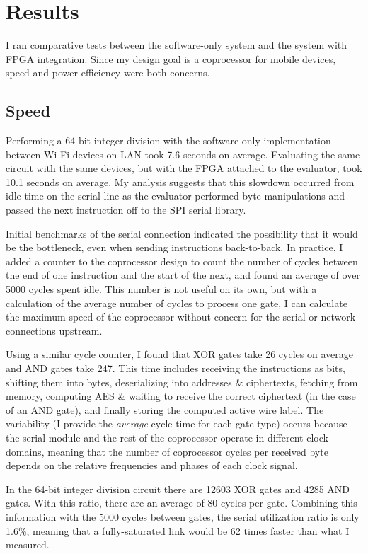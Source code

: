 \section{Results}
I ran comparative tests between the software-only system and the system with FPGA integration. Since my design goal is a coprocessor for mobile devices, speed and power efficiency were both concerns.

\subsection{Speed}
Performing a 64-bit integer division with the software-only implementation between Wi-Fi devices on LAN took 7.6 seconds on average. Evaluating the same circuit with the same devices, but with the FPGA attached to the evaluator, took 10.1 seconds on average. My analysis suggests that this slowdown occurred from idle time on the serial line as the evaluator performed byte manipulations and passed the next instruction off to the SPI serial library.

Initial benchmarks of the serial connection indicated the possibility that it would be the bottleneck, even when sending instructions back-to-back. In practice, I added a counter to the coprocessor design to count the number of cycles between the end of one instruction and the start of the next, and found an average of over 5000 cycles spent idle. This number is not useful on its own, but with a calculation of the average number of cycles to process one gate, I can calculate the maximum speed of the coprocessor without concern for the serial or network connections upstream.

Using a similar cycle counter, I found that XOR gates take 26 cycles on average and AND gates take 247. This time includes receiving the instructions as bits, shifting them into bytes, deserializing into addresses \& ciphertexts, fetching from memory, computing AES \& waiting to receive the correct ciphertext (in the case of an AND gate), and finally storing the computed active wire label. The variability (I provide the \textit{average} cycle time for each gate type) occurs
because the serial module and the rest of the coprocessor operate in different clock domains, meaning that the number of coprocessor cycles per received byte depends on the relative frequencies and phases of each clock signal.

In the 64-bit integer division circuit\cite{bristol} there are 12603 XOR gates and 4285 AND gates. With this ratio, there are an average of 80 cycles per gate. Combining this information with the 5000 cycles between gates, the serial utilization ratio is only 1.6\%, meaning that a fully-saturated link would be 62 times faster than what I measured.

